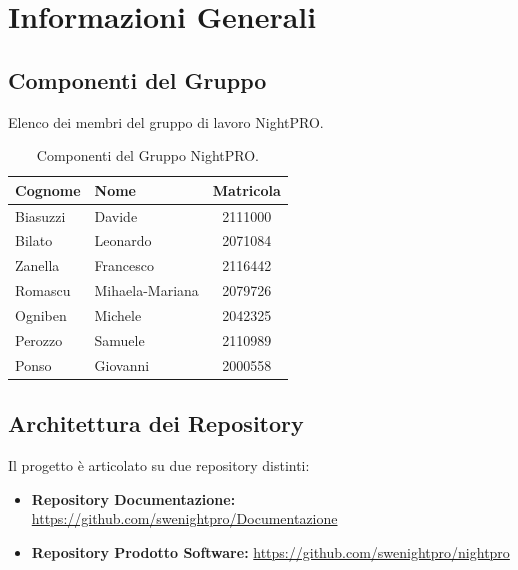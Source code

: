 \documentclass[a4paper, 11pt, oneside]{scrartcl} %
\begin{document}
\newpage
\tableofcontents %
\pagestyle{fancy} %

\newpage
\section{Informazioni Generali}

\subsection{Componenti del Gruppo}
Elenco dei membri del gruppo di lavoro NightPRO.

\begin{table}[h!]
\centering
\begin{tabular}{@{}llc@{}}
\toprule
\textbf{Cognome} & \textbf{Nome} & \textbf{Matricola} \\
\midrule
Biasuzzi & Davide & 2111000 \\
Bilato & Leonardo & 2071084 \\
Zanella & Francesco & 2116442 \\
Romascu & Mihaela-Mariana & 2079726 \\
Ogniben & Michele & 2042325 \\
Perozzo & Samuele & 2110989 \\
Ponso & Giovanni & 2000558 \\
\bottomrule
\end{tabular}
\caption{Componenti del Gruppo NightPRO.}
\end{table}

\subsection{Architettura dei Repository}
Il progetto è articolato su due repository distinti:
\begin{itemize}
    \item \textbf{Repository Documentazione:} \url{https://github.com/swenightpro/Documentazione}
    \item \textbf{Repository Prodotto Software:} \url{https://github.com/swenightpro/nightpro}
\end{itemize}
\end{document}
